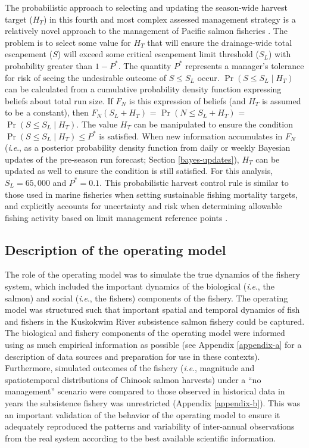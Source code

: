 \documentclass[12pt,]{book}
\theoremstyle{definition}
\theoremstyle{definition}
\theoremstyle{definition}
\theoremstyle{remark}
\begin{document}
The probabilistic approach to selecting and updating the season-wide
harvest target (\(H_T\)) in this fourth and most complex assessed
management strategy is a relatively novel approach to the management of
Pacific salmon fisheries \citep[but see][ for another application using
simulation techniques]{catalano-jones-2014}. The problem is to select
some value for \(H_T\) that will ensure the drainage-wide total
escapement (\(S\)) will exceed some critical escapement limit threshold
(\(S_L\)) with probability greater than \(1 - P^*\). The quantity
\(P^*\) represents a manager's tolerance for risk of seeing the
undesirable outcome of \(S \le S_L\) occur. \(\Pr(S \le S_L \mid H_T)\)
can be calculated from a cumulative probability density function
expressing beliefs about total run size. If \(F_N\) is this expression
of beliefs (and \(H_T\) is assumed to be a constant), then
\(F_N(S_L + H_T)\) = \(\Pr(N \le S_L + H_T)\) =
\(\Pr(S \le S_L \mid H_T)\). The value \(H_T\) can be manipulated to
ensure the condition \(\Pr(S \le S_L \mid H_T) \le P^*\) is satisfied.
When new information accumulates in \(F_N\) (\emph{i}.\emph{e}., as a
posterior probability density function from daily or weekly Bayesian
updates of the pre-season run forecast; Section \ref{bayes-updates}),
\(H_T\) can be updated as well to ensure the condition is still
satisfied. For this analysis, \(S_L = 65,000\) \citep[the lower bound of
the current drainage-wide escapement goal for Chinook
salmon;][]{hamazaki-etal-2012} and \(P^* = 0.1\). This probabilistic
harvest control rule is similar to those used in marine fisheries when
setting sustainable fishing mortality targets, and explicitly accounts
for uncertainty and risk when determining allowable fishing activity
based on limit management reference points
\citep{prager-etal-2003, shertzer-etal-2010}.

\subsection{Description of the operating model}\label{om}

\noindent
The role of the operating model was to simulate the true dynamics of the
fishery system, which included the important dynamics of the biological
(\emph{i}.\emph{e}., the salmon) and social (\emph{i}.\emph{e}., the
fishers) components of the fishery. The operating model was structured
such that important spatial and temporal dynamics of fish and fishers in
the Kuskokwim River subsistence salmon fishery could be captured. The
biological and fishery components of the operating model were informed
using as much empirical information as possible (see Appendix
\ref{appendix-a} for a description of data sources and preparation for
use in these contexts). Furthermore, simulated outcomes of the fishery
(\emph{i}.\emph{e}., magnitude and spatiotemporal distributions of
Chinook salmon harvests) under a ``no management'' scenario were
compared to those observed in historical data in years the subsistence
fishery was unrestricted (Appendix \ref{appendix-b}). This was an
important validation of the behavior of the operating model to ensure it
adequately reproduced the patterns and variability of inter-annual
observations from the real system according to the best available
scientific information.
\end{document}
